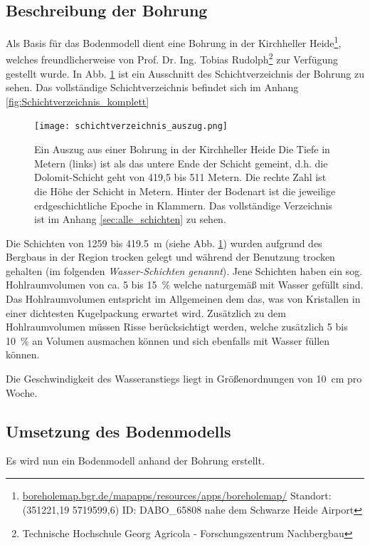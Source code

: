 \subsection{Beschreibung der Bohrung}
Als Basis für das Bodenmodell dient eine Bohrung in der 
Kirchheller Heide\footnote{
    \url{boreholemap.bgr.de/mapapps/resources/apps/boreholemap/} 
    Standort: (351221,19 5719599,6) 
    ID: DABO\_65808 nahe dem Schwarze Heide Airport},
welches freundlicherweise von 
Prof. Dr. Ing. Tobias Rudolph\footnote{Technische Hochschule Georg Agricola - Forschungszentrum Nachbergbau}
zur Verfügung gestellt wurde.
In Abb. \ref{fig:Schichtverzeichnis_auszug} ist ein Ausschnitt des Schichtverzeichnis der Bohrung zu sehen.
Das vollständige Schichtverzeichnis befindet sich im Anhang
\ref{fig:Schichtverzeichnis_komplett}

\begin{figure}[h]
    \centering
    \texttt{[image: schichtverzeichnis\_auszug.png]}
    \caption{Ein Auszug aus einer Bohrung in der Kirchheller Heide 
    Die Tiefe in Metern (links) ist als das untere Ende der Schicht gemeint,
    d.h. die Dolomit-Schicht geht von 419,5 bis 511 Metern.
    Die rechte Zahl ist die Höhe der Schicht in Metern.
    Hinter der Bodenart ist die jeweilige erdgeschichtliche Epoche in Klammern.
    Das vollständige Verzeichnis ist im Anhang \ref{sec:alle_schichten} zu sehen.}
    \label{fig:Schichtverzeichnis_auszug}
\end{figure}
 
Die Schichten von \num{1259} bis \SI{419,5}{m} (siehe Abb. \ref{fig:Schichtverzeichnis_auszug})
wurden aufgrund des Bergbaus in der Region trocken gelegt und während der Benutzung trocken gehalten 
(im folgenden \textit{Wasser-Schichten genannt}).
Jene Schichten haben ein sog. Hohlraumvolumen von ca. \num{5} bis \SI{15}{\percent}
welche naturgemäß mit Wasser gefüllt sind.
Das Hohlraumvolumen entspricht im Allgemeinen dem das, was von Kristallen 
in einer dichtesten Kugelpackung erwartet wird.
Zusätzlich zu dem Hohlraumvolumen müssen Risse berücksichtigt werden, welche zusätzlich 
\num{5} bis \SI{10}{\%} an Volumen ausmachen können und sich ebenfalls mit Wasser
füllen können.

Die Geschwindigkeit des Wasseranstiegs liegt in Größenordnungen von 
\SI{10}{cm} pro Woche. 

\subsection{Umsetzung des Bodenmodells}
Es wird nun ein Bodenmodell anhand der Bohrung erstellt.

